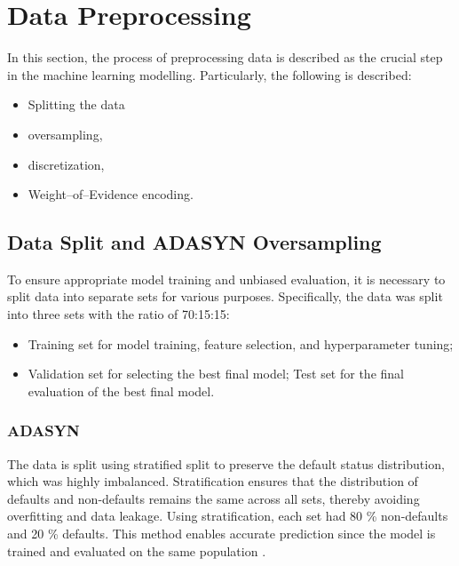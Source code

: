 \section{Data Preprocessing}
In this section, the process of preprocessing data is described as the crucial step in the machine learning modelling. Particularly, the following is described:
\begin{itemize}\setlength\itemsep{0em}
    \item Splitting the data
    \item oversampling,
    \item discretization,
    \item Weight--of--Evidence encoding.
\end{itemize}


\subsection{Data Split and ADASYN Oversampling}
\label{subsec:data-split-ADASYN}

To ensure appropriate model training and unbiased evaluation, it is necessary to split data into separate sets for various purposes. Specifically, the data was split into three sets with the ratio of 70:15:15:
\begin{itemize}\setlength\itemsep{0em} 
    \item Training set for model training, feature selection, and hyperparameter tuning;
    \item Validation set for selecting the best final model;
    Test set for the final evaluation of the best final model.
\end{itemize}

\subsubsection{ADASYN}
The data is split using stratified split to preserve the default status distribution, which was highly imbalanced.
Stratification ensures that the distribution of defaults and non-defaults remains the same across all sets, thereby avoiding overfitting and data leakage. Using stratification, each set had 80 \% non-defaults and 20 \% defaults. This method enables accurate prediction since the model is trained and evaluated on the same population \citep{igareta2021strat}.

